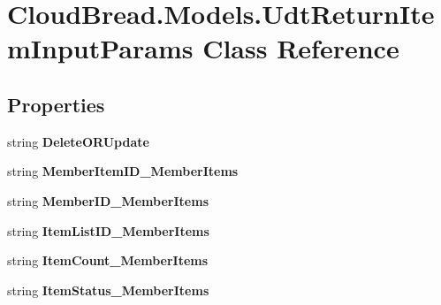 \hypertarget{a00113}{}\section{Cloud\+Bread.\+Models.\+Udt\+Return\+Item\+Input\+Params Class Reference}
\label{a00113}
\subsection*{Properties}
\begin{DoxyCompactItemize}
\item 
string {\bfseries Delete\+O\+R\+Update}\hypertarget{a00113_aa6b630a3008468ea89202060009e2a5a}{}\label{a00113_aa6b630a3008468ea89202060009e2a5a}

\item 
string {\bfseries Member\+Item\+I\+D\+\_\+\+Member\+Items}\hypertarget{a00113_a29c8023903fb073f20c1cfc4ad4b60c4}{}\label{a00113_a29c8023903fb073f20c1cfc4ad4b60c4}

\item 
string {\bfseries Member\+I\+D\+\_\+\+Member\+Items}\hypertarget{a00113_a475b798dd6905c2611b1c17deb406d56}{}\label{a00113_a475b798dd6905c2611b1c17deb406d56}

\item 
string {\bfseries Item\+List\+I\+D\+\_\+\+Member\+Items}\hypertarget{a00113_ae7b55328b2ae5986171be236fc42f700}{}\label{a00113_ae7b55328b2ae5986171be236fc42f700}

\item 
string {\bfseries Item\+Count\+\_\+\+Member\+Items}\hypertarget{a00113_a292da3099567e9340382024e3d6119b2}{}\label{a00113_a292da3099567e9340382024e3d6119b2}

\item 
string {\bfseries Item\+Status\+\_\+\+Member\+Items}\hypertarget{a00113_a90f82b8aa45179ccd93025a5c3a21a5c}{}\label{a00113_a90f82b8aa45179ccd93025a5c3a21a5c}


\end{DoxyCompactItemize}
